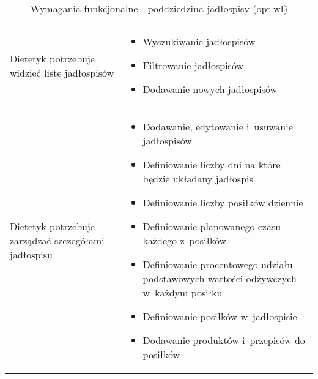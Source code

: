 \begin{minipage}{\textwidth}
    \begin{table}[H]
        \centering\caption{Wymagania funkcjonalne - poddziedzina jadłospisy (opr.wł)\label{tabela:wymaganiaFunkcjonalneJadlospisy}}
        \begin{tabular}{|P{.3\textwidth}|P{.6\textwidth}|}
            \hline
             &  \\

            \hline
            Dietetyk potrzebuje widzieć listę jadłospisów &
            \begin{itemize}
                \item Wyszukiwanie jadłospisów
                \item Filtrowanie jadłospisów
                \item Dodawanie nowych jadłospisów
            \end{itemize} \\
            \hline
            Dietetyk potrzebuje zarządzać szczegółami jadłospisu &
            \begin{itemize}
                \item Dodawanie, edytowanie i~usuwanie jadłospisów
                \item Definiowanie liczby dni na które będzie układany jadłospis
                \item Definiowanie liczby posiłków dziennie
                \item Definiowanie planowanego czasu każdego z~posiłków
                \item Definiowanie procentowego udziału podstawowych wartości odżywczych w~każdym posiłku
                \item Definiowanie posiłków w~jadłospisie
                \item Dodawanie produktów i~przepisów do posiłków
            \end{itemize} \\
            \hline
        \end{tabular}
    \end{table}
\end{minipage}

